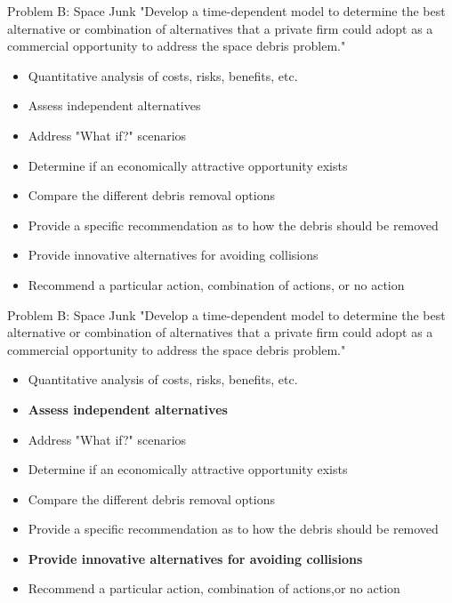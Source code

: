\documentclass{beamer}
\begin{document}
\begin{frame}{Problem B: Space Junk}
"Develop a time-dependent model to determine the best alternative or combination of alternatives
that a private firm could adopt as a commercial opportunity to address the space debris problem."
  \begin{itemize}
  \item {Quantitative analysis of costs, risks, benefits, etc.}
  \item {Assess independent alternatives}
  \item {Address "What if?" scenarios}
  \item {Determine if an economically attractive opportunity exists}
  \item {Compare the different debris removal options}
  \item {Provide a specific recommendation as to how the debris should be removed}
  \item {Provide innovative alternatives for avoiding collisions}
  \item {Recommend a particular action, combination of actions,
or no action}
  \end{itemize}
\end{frame}

\begin{frame}{Problem B: Space Junk}
"Develop a time-dependent model to determine the best alternative or combination of alternatives
that a private firm could adopt as a commercial opportunity to address the space debris problem."
  \begin{itemize}
  \item {Quantitative analysis of costs, risks, benefits, etc.}
  \item {\textbf{Assess independent alternatives}}
  \item {Address "What if?" scenarios}
  \item {Determine if an economically attractive opportunity exists}
  \item {Compare the different debris removal options}
  \item {Provide a specific recommendation as to how the debris should be removed}
  \item {\textbf{Provide innovative alternatives for avoiding collisions}}
  \item {Recommend a particular action, combination of actions,or no action}
  \end{itemize}
\end{frame}
\end{document}
